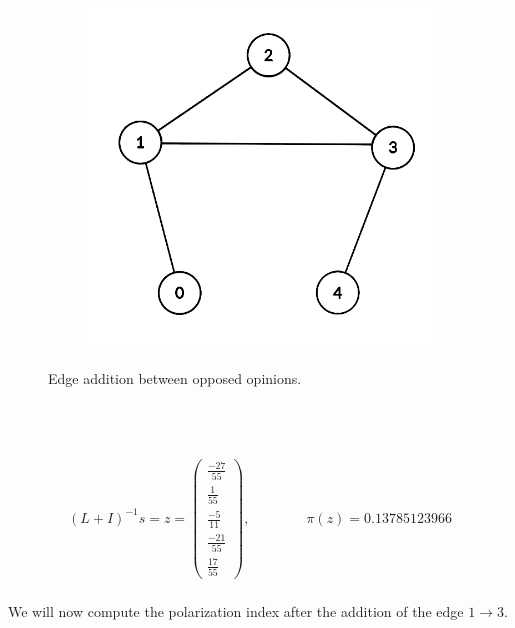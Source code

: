 \begin{figure}[h]
\begin{subfigure}[t]{0.3\textwidth}
		\includegraphics[height=0.15\textheight]{Figures/p5B}
		\caption{}
		\label{subfig:monotonicityB}
	\end{subfigure}
	\vspace{40pt}
	\hfill
	\caption{Edge addition between opposed opinions.}
	\label{fig:p5}
\end{figure}
\\
\\

\clearpage

\begin{equation}
	\begin{aligned}
		(L+I)^{-1}s=z=
		\left(\begin{matrix}
		\frac{-27}{55} \\
		\frac{1}{55} \\
		\frac{-5}{11} \\
		\frac{-21}{55} \\
		\frac{17}{55}
		\end{matrix}\right),
		\qquad \qquad
		\pi(z)= 0.13785123966
	\end{aligned}
\end{equation}
\\
We will now compute the polarization index after the addition of the edge $1\rightarrow3$.

